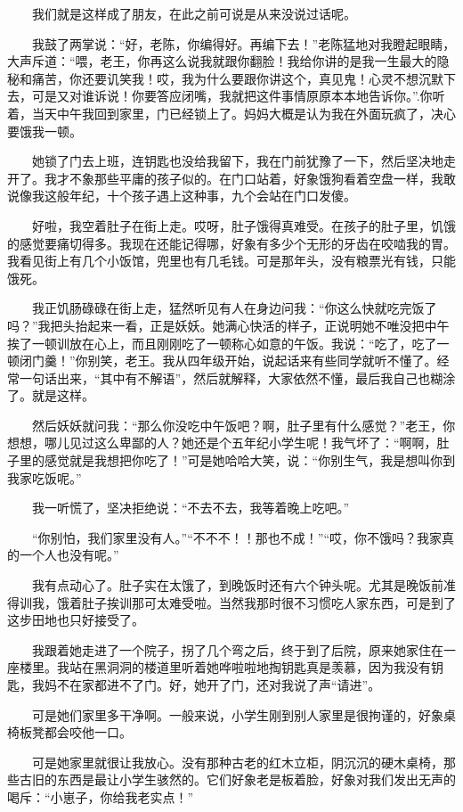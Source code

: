  　　我们就是这样成了朋友，在此之前可说是从来没说过话呢。 
 
 　　我鼓了两掌说：“好，老陈，你编得好。再编下去！”老陈猛地对我瞪起眼睛，大声斥道：“喂，老王，你再这么说我就跟你翻脸！我给你讲的是我一生最大的隐秘和痛苦，你还要讥笑我！哎，我为什么要跟你讲这个，真见鬼！心灵不想沉默下去，可是又对谁诉说！你要答应闭嘴，我就把这件事情原原本本地告诉你。”.你听着，当天中午我回到家里，门已经锁上了。妈妈大概是认为我在外面玩疯了，决心要饿我一顿。 
 
 　　她锁了门去上班，连钥匙也没给我留下，我在门前犹豫了一下，然后坚决地走开了。我才不象那些平庸的孩子似的。在门口站着，好象饿狗看着空盘一样，我敢说像我这般年纪，十个孩子遇上这种事，九个会站在门口发傻。 
 
 　　好啦，我空着肚子在街上走。哎呀，肚子饿得真难受。在孩子的肚子里，饥饿的感觉要痛切得多。我现在还能记得哪，好象有多少个无形的牙齿在咬啮我的胃。我看见街上有几个小饭馆，兜里也有几毛钱。可是那年头，没有粮票光有钱，只能饿死。 
 
 　　我正饥肠碌碌在街上走，猛然听见有人在身边问我：“你这么快就吃完饭了吗？”我把头抬起来一看，正是妖妖。她满心快活的样子，正说明她不唯没把中午挨了一顿训放在心上，而且刚刚吃了一顿称心如意的午饭。我说：“吃了，吃了一顿闭门羹！”你别笑，老王。我从四年级开始，说起话来有些同学就听不懂了。经常一句话出来，“其中有不解语”，然后就解释，大家依然不懂，最后我自己也糊涂了。就是这样。 
 
 　　然后妖妖就问我：“那么你没吃中午饭吧？啊，肚子里有什么感觉？”老王，你想想，哪儿见过这么卑鄙的人？她还是个五年纪小学生呢！我气坏了：“啊啊，肚子里的感觉就是我想把你吃了！”可是她哈哈大笑，说：“你别生气，我是想叫你到我家吃饭呢。” 
 
 　　我一听慌了，坚决拒绝说：“不去不去，我等着晚上吃吧。” 
 
 　　“你别怕，我们家里没有人。”“不不不！！那也不成！”“哎，你不饿吗？我家真的一个人也没有呢。” 
 
 　　我有点动心了。肚子实在太饿了，到晚饭时还有六个钟头呢。尤其是晚饭前准得训我，饿着肚子挨训那可太难受啦。当然我那时很不习惯吃人家东西，可是到了这步田地也只好接受了。 
 
 　　我跟着她走进了一个院子，拐了几个弯之后，终于到了后院，原来她家住在一座楼里。我站在黑洞洞的楼道里听着她哗啦啦地掏钥匙真是羡慕，因为我没有钥匙，我妈不在家都进不了门。好，她开了门，还对我说了声“请进”。 
 
 　　可是她们家里多干净啊。一般来说，小学生刚到别人家里是很拘谨的，好象桌椅板凳都会咬他一口。 
 
 　　可是她家里就很让我放心。没有那种古老的红木立柜，阴沉沉的硬木桌椅，那些古旧的东西是最让小学生骇然的。它们好象老是板着脸，好象对我们发出无声的喝斥：“小崽子，你给我老实点！” 
 
